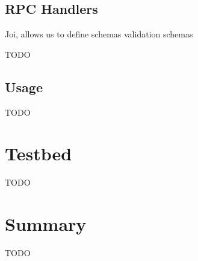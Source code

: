 \subsection{RPC Handlers}\label{subsec:rpc-handlers}

Joi, allows us to define schemas validation schemas  

TODO

\subsection{Usage}\label{subsec:usage}

TODO

\section{Testbed}\label{testbed}

TODO

\section{Summary}\label{summary}

TODO
